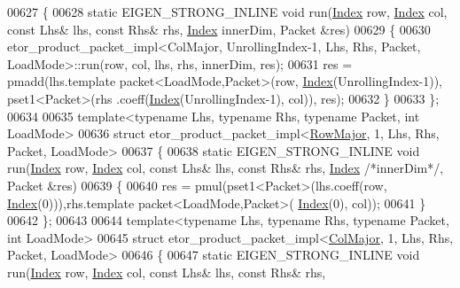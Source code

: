 \begin{DoxyCode}
00627 \{
00628   \textcolor{keyword}{static} EIGEN\_STRONG\_INLINE \textcolor{keywordtype}{void} run(\hyperlink{namespace_eigen_a62e77e0933482dafde8fe197d9a2cfde}{Index} row, \hyperlink{namespace_eigen_a62e77e0933482dafde8fe197d9a2cfde}{Index} col, \textcolor{keyword}{const} Lhs& lhs, \textcolor{keyword}{const} Rhs& rhs, 
      \hyperlink{namespace_eigen_a62e77e0933482dafde8fe197d9a2cfde}{Index} innerDim, Packet &res)
00629   \{
00630     etor\_product\_packet\_impl<ColMajor, UnrollingIndex-1, Lhs, Rhs, Packet, LoadMode>::run(row, col, lhs, 
      rhs, innerDim, res);
00631     res =  pmadd(lhs.template packet<LoadMode,Packet>(row, \hyperlink{namespace_eigen_a62e77e0933482dafde8fe197d9a2cfde}{Index}(UnrollingIndex-1)), pset1<Packet>(rhs
      .coeff(\hyperlink{namespace_eigen_a62e77e0933482dafde8fe197d9a2cfde}{Index}(UnrollingIndex-1), col)), res);
00632   \}
00633 \};
00634 
00635 \textcolor{keyword}{template}<\textcolor{keyword}{typename} Lhs, \textcolor{keyword}{typename} Rhs, \textcolor{keyword}{typename} Packet, \textcolor{keywordtype}{int} LoadMode>
00636 \textcolor{keyword}{struct }etor\_product\_packet\_impl<\hyperlink{group__enums_ggaacded1a18ae58b0f554751f6cdf9eb13acfcde9cd8677c5f7caf6bd603666aae3}{RowMajor}, 1, Lhs, Rhs, Packet, LoadMode>
00637 \{
00638   \textcolor{keyword}{static} EIGEN\_STRONG\_INLINE \textcolor{keywordtype}{void} run(\hyperlink{namespace_eigen_a62e77e0933482dafde8fe197d9a2cfde}{Index} row, \hyperlink{namespace_eigen_a62e77e0933482dafde8fe197d9a2cfde}{Index} col, \textcolor{keyword}{const} Lhs& lhs, \textcolor{keyword}{const} Rhs& rhs, 
      \hyperlink{namespace_eigen_a62e77e0933482dafde8fe197d9a2cfde}{Index} \textcolor{comment}{/*innerDim*/}, Packet &res)
00639   \{
00640     res = pmul(pset1<Packet>(lhs.coeff(row, \hyperlink{namespace_eigen_a62e77e0933482dafde8fe197d9a2cfde}{Index}(0))),rhs.template packet<LoadMode,Packet>(
      \hyperlink{namespace_eigen_a62e77e0933482dafde8fe197d9a2cfde}{Index}(0), col));
00641   \}
00642 \};
00643 
00644 \textcolor{keyword}{template}<\textcolor{keyword}{typename} Lhs, \textcolor{keyword}{typename} Rhs, \textcolor{keyword}{typename} Packet, \textcolor{keywordtype}{int} LoadMode>
00645 \textcolor{keyword}{struct }etor\_product\_packet\_impl<\hyperlink{group__enums_ggaacded1a18ae58b0f554751f6cdf9eb13a0cbd4bdd0abcfc0224c5fcb5e4f6669a}{ColMajor}, 1, Lhs, Rhs, Packet, LoadMode>
00646 \{
00647   \textcolor{keyword}{static} EIGEN\_STRONG\_INLINE \textcolor{keywordtype}{void} run(\hyperlink{namespace_eigen_a62e77e0933482dafde8fe197d9a2cfde}{Index} row, \hyperlink{namespace_eigen_a62e77e0933482dafde8fe197d9a2cfde}{Index} col, \textcolor{keyword}{const} Lhs& lhs, \textcolor{keyword}{const} Rhs& rhs, 

\end{DoxyCode}
